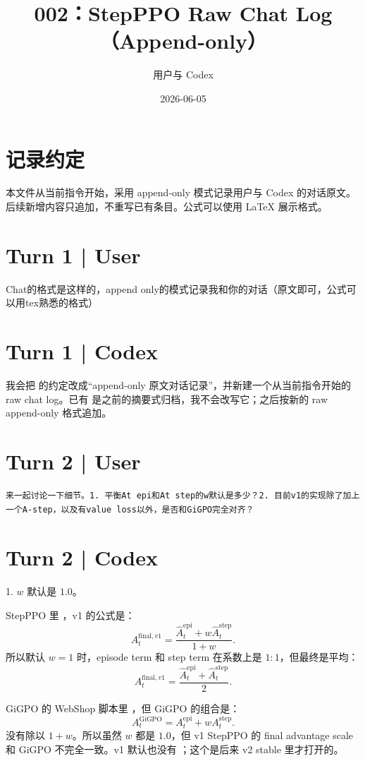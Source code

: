 \documentclass[10pt]{ctexart}
\title{002：StepPPO Raw Chat Log（Append-only）}
\author{用户与 Codex}
\date{2026-06-05}
\begin{document}
\maketitle
\vspace{-1.2em}

\section*{记录约定}
本文件从当前指令开始，采用 append-only 模式记录用户与 Codex 的对话原文。后续新增内容只追加，不重写已有条目。公式可以使用 LaTeX 展示格式。

\section*{Turn 1 | User}
Chat的格式是这样的，append only的模式记录我和你的对话（原文即可，公式可以用tex熟悉的格式）

\section*{Turn 1 | Codex}
我会把  的约定改成“append-only 原文对话记录”，并新建一个从当前指令开始的 raw chat log。已有  是之前的摘要式归档，我不会改写它；之后按新的 raw append-only 格式追加。

\section*{Turn 2 | User}
\begin{Verbatim}[breaklines=true,breakanywhere=true]
来一起讨论一下细节。1. 平衡At epi和At step的w默认是多少？2. 目前v1的实现除了加上一个A-step，以及有value loss以外，是否和GiGPO完全对齐？
\end{Verbatim}

\section*{Turn 2 | Codex}
1. $w$ 默认是 $1.0$。

StepPPO 里 ，v1 的公式是：
\[
A_t^{\mathrm{final},v1}
=
\frac{\widehat A_t^{\mathrm{epi}} + w\widehat A_t^{\mathrm{step}}}{1+w}.
\]
所以默认 $w=1$ 时，episode term 和 step term 在系数上是 $1:1$，但最终是平均：
\[
A_t^{\mathrm{final},v1}
=
\frac{\widehat A_t^{\mathrm{epi}} + \widehat A_t^{\mathrm{step}}}{2}.
\]

GiGPO 的 WebShop 脚本里 ，但 GiGPO 的组合是：
\[
A_t^{\mathrm{GiGPO}}
=
A_t^{\mathrm{epi}} + w A_t^{\mathrm{step}}.
\]
没有除以 $1+w$。所以虽然 $w$ 都是 $1.0$，但 v1 StepPPO 的 final advantage scale 和 GiGPO 不完全一致。v1 默认也没有 ；这个是后来 v2 stable 里才打开的。
\end{document}
